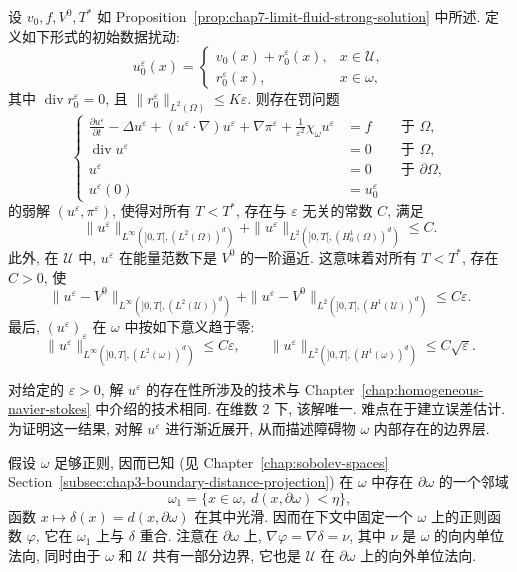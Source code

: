 \begin{sloppypar}
\begin{Theorem}
\label{thm:chap7-penalty-error}
设 $v_0,f,V^0,T^*$ 如 Proposition~\ref{prop:chap7-limit-fluid-strong-solution} 中所述. 定义如下形式的初始数据扰动:
\[
 u_0^\varepsilon(x)=
 \begin{cases}
  v_0(x)+r_0^\varepsilon(x),&x\in\mathcal U,\\
  r_0^\varepsilon(x),&x\in\omega,
 \end{cases}
\]
其中 $\operatorname{div}r_0^\varepsilon=0$, 且
$\|r_0^\varepsilon\|_{L^2(\Omega)}\leq K\varepsilon$. 则存在罚问题
\[
\left\{
\begin{aligned}
 \frac{\partial u^\varepsilon}{\partial t}-\Delta u^\varepsilon
 +(u^\varepsilon\cdot\nabla)u^\varepsilon+\nabla\pi^\varepsilon
 +\frac1{\varepsilon^2}\chi_\omega u^\varepsilon&=f&&\text{于 }\Omega,\\
 \operatorname{div}u^\varepsilon&=0&&\text{于 }\Omega,\\
 u^\varepsilon&=0&&\text{于 }\partial\Omega,\\
 u^\varepsilon(0)&=u_0^\varepsilon
\end{aligned}
\right.
\]
的弱解 $(u^\varepsilon,\pi^\varepsilon)$, 使得对所有 $T<T^*$, 存在与 $\varepsilon$ 无关的常数 $C$, 满足
\[
 \|u^\varepsilon\|_{L^\infty(]0,T[,(L^2(\Omega))^d)}
 +\|u^\varepsilon\|_{L^2(]0,T[,(H_0^1(\Omega))^d)}\leq C.
\]
此外, 在 $\mathcal U$ 中, $u^\varepsilon$ 在能量范数下是 $V^0$ 的一阶逼近. 这意味着对所有 $T<T^*$, 存在 $C>0$, 使
\[
 \|u^\varepsilon-V^0\|_{L^\infty(]0,T[,(L^2(\mathcal U))^d)}
 +\|u^\varepsilon-V^0\|_{L^2(]0,T[,(H^1(\mathcal U))^d)}
 \leq C\varepsilon.
\]
最后, $(u^\varepsilon)_\varepsilon$ 在 $\omega$ 中按如下意义趋于零:
\[
 \|u^\varepsilon\|_{L^\infty(]0,T[,(L^2(\omega))^d)}\leq C\varepsilon,
 \qquad
 \|u^\varepsilon\|_{L^2(]0,T[,(H^1(\omega))^d)}\leq C\sqrt\varepsilon.
\]
\end{Theorem}

对给定的 $\varepsilon>0$, 解 $u^\varepsilon$ 的存在性所涉及的技术与 Chapter~\ref{chap:homogeneous-navier-stokes} 中介绍的技术相同. 在维数 $2$ 下, 该解唯一. 难点在于建立误差估计. 为证明这一结果, 对解 $u^\varepsilon$ 进行渐近展开, 从而描述障碍物 $\omega$ 内部存在的边界层.

假设 $\omega$ 足够正则, 因而已知 (见 Chapter~\ref{chap:sobolev-spaces} Section~\ref{subsec:chap3-boundary-distance-projection}) 在 $\omega$ 中存在 $\partial\omega$ 的一个邻域
\[
 \omega_1=\{x\in\omega,\ d(x,\partial\omega)<\eta\},
\]
函数 $x\mapsto\delta(x)=d(x,\partial\omega)$ 在其中光滑. 因而在下文中固定一个 $\omega$ 上的正则函数 $\varphi$, 它在 $\omega_1$ 上与 $\delta$ 重合. 注意在 $\partial\omega$ 上,
$\nabla\varphi=\nabla\delta=\nu$, 其中 $\nu$ 是 $\omega$ 的向内单位法向, 同时由于 $\omega$ 和 $\mathcal U$ 共有一部分边界, 它也是 $\mathcal U$ 在 $\partial\omega$ 上的向外单位法向.


\end{sloppypar}
